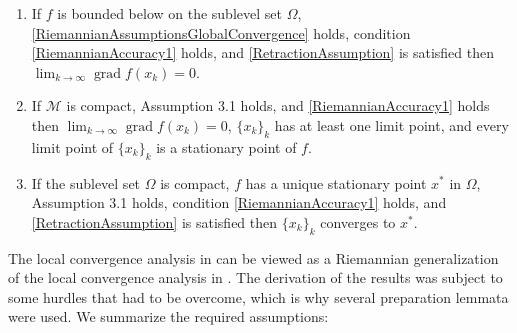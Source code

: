 \begin{theorem} \label{RiemannianGlobalConvergence}
    \begin{enumerate}
        \item If $f$ is bounded below on the sublevel set $\Omega$, \cref{RiemannianAssumptionsGlobalConvergence} holds, condition \cref{RiemannianAccuracy1} holds, and \cref{RetractionAssumption} is satisfied then $\lim_{k \rightarrow \infty} \operatorname{grad} f(x_k) = 0$.
        \item If $\mathcal{M}$ is compact, Assumption 3.1 holds, and \cref{RiemannianAccuracy1} holds then $\lim_{k \rightarrow \infty} \operatorname{grad} f(x_k) = 0$, $\{ x_k \}_k$ has at least one limit point, and every limit point of $\{ x_k \}_k$ is a stationary point of $f$.
        \item If the sublevel set $\Omega$ is compact, $f$ has a unique stationary point $x^*$ in $\Omega$, Assumption 3.1 holds, condition \cref{RiemannianAccuracy1} holds, and \cref{RetractionAssumption} is satisfied then $\{ x_k \}_k$ converges to $x^*$.
    \end{enumerate}
\end{theorem}
The local convergence analysis in \cite{HuangAbsilGallivan:2014} can be viewed as a Riemannian generalization of the local convergence analysis in \cite{ByrdKhalfanSchnabel:1996}. The derivation of the results was subject to some hurdles that had to be overcome, which is why several preparation lemmata were used. We summarize the required assumptions:
